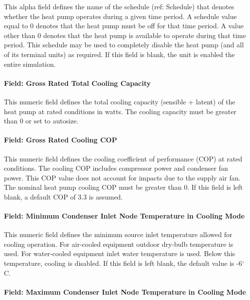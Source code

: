 This alpha field defines the name of the schedule (ref: Schedule) that denotes whether the heat pump operates during a given time period. A schedule value equal to 0 denotes that the heat pump must be off for that time period. A value other than 0 denotes that the heat pump is available to operate during that time period. This schedule may be used to completely disable the heat pump (and all of its terminal units) as required. If this field is blank, the unit is enabled the entire simulation.

\paragraph{Field: Gross Rated Total Cooling Capacity}\label{field-gross-rated-total-cooling-capacity-001}

This numeric field defines the total cooling capacity (sensible + latent) of the heat pump at rated conditions in watts. The cooling capacity must be greater than 0 or set to autosize.

\paragraph{Field: Gross Rated Cooling COP}\label{field-gross-rated-cooling-cop-001}

This numeric field defines the cooling coefficient of performance (COP) at rated conditions. The cooling COP includes compressor power and condenser fan power. This COP value does not account for impacts due to the supply air fan. The nominal heat pump cooling COP must be greater than 0. If this field is left blank, a default COP of 3.3 is assumed.

\paragraph{Field: Minimum Condenser Inlet Node Temperature in Cooling Mode}\label{field-minimum-condenser-inlet-node-temperature-in-cooling-mode-000}

This numeric field defines the minimum source inlet temperature allowed for cooling operation. For air-cooled equipment outdoor dry-bulb temperature is used. For water-cooled equipment inlet water temperature is used. Below this temperature, cooling is disabled. If this field is left blank, the default value is -6$^\circ$C.

\paragraph{Field: Maximum Condenser Inlet Node Temperature in Cooling Mode}\label{field-maximum-condenser-inlet-node-temperature-in-cooling-mode-000}

